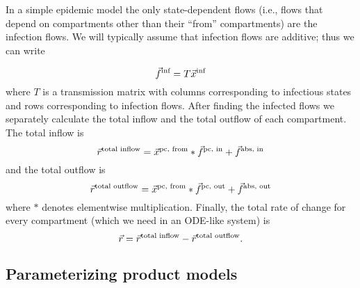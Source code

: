 In a simple epidemic model the only state-dependent flows (i.e., flows that depend on  compartments other than their ``from'' compartments) are the infection flows. We will typically assume that infection flows are additive; thus we can write
    
\begin{equation}\label{infectionequation}
\vec{f}^\text{inf} = T\vec{x}^\text{inf}
\end{equation}
where $T$ is a transmission matrix with columns corresponding to infectious states and rows corresponding to infection flows.
After finding the infected flows we separately calculate the total inflow and the total outflow of each compartment.
The total inflow is
\[
    \vec{r}^\text{total inflow} = \vec{x}^\text{pc, from} * \vec{f}^\text{pc, in} + \vec{f}^\text{abs, in}
\]
and the total outflow is
\[
    \vec{r}^\text{total outflow} = \vec{x}^\text{pc, from} * \vec{f}^\text{pc, out} + \vec{f}^\text{abs, out}
\]
where $*$ denotes elementwise multiplication. 
Finally, the total rate of change for every compartment (which we need in an ODE-like system) is
\[
\vec{r} = \vec{r}^\text{total inflow} - \vec{r}^\text{total outflow} .
\]     

\subsection{Parameterizing product models}

